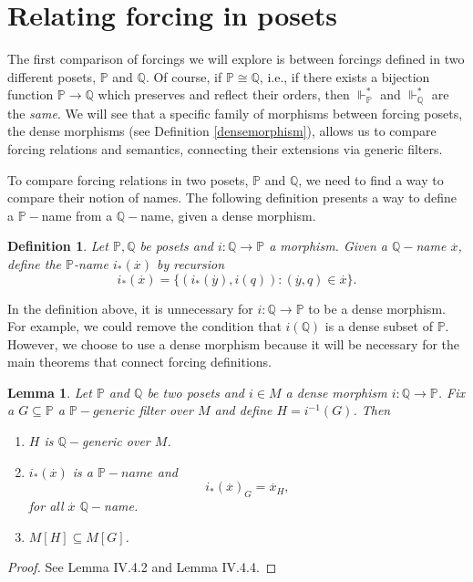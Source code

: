 \documentclass[10pt,longbibliography]{article}
\newtheorem{Def}[Theo]{Definition}
\newtheorem{Lemma}[Theo]{Lemma}
\newcommand{\Po}{\mathbb{P}}
\newcommand{\Qo}{\mathbb{Q}}
\newcommand{\ydot}{\overset{.}{y}}
\newcommand{\xdot}{\overset{.}{x}}
\newcommand{\forces}{\Vdash^{*}}
\begin{document}
\section{Relating forcing in posets}\label{rfr}


The first comparison of forcings we will explore is between forcings defined in two different posets, $\Po$ and $\Qo$. Of course, if $\Po \cong \Qo$, i.e., if there exists a bijection function $\Po \to \Qo$ which preserves and reflect their orders, then $\forces_{\Po}$ and $\forces_{\Qo}$ are the \emph{same}. We will see that a specific family of morphisms between forcing posets, the dense morphisms (see Definition \ref{densemorphism}), allows us to compare forcing relations and semantics, connecting their extensions via generic filters. 

To compare forcing relations in two posets, $\Po$ and $\Qo$, we need to find a way to compare their notion of names. The following definition presents a way to define a $\Po-$name from a $\Qo-$name, given a dense morphism.
\begin{Def}\label{i*definition}
	Let $\Po,\Qo$ be posets and $i: \Qo \to \Po$ a  morphism. Given a $\Qo-$name $\xdot$, define the $\Po$-name  $i_{*}(\xdot)$ by recursion $$i_{*}(\xdot) = \{(i_{*}(\ydot),  i(q)): (\ydot,q) \in \xdot \}.$$  
\end{Def}
In the definition above, it is unnecessary for $i: \Qo \to \Po$ to be a dense morphism. For example, we could remove the condition that $i(\Qo)$ is a dense subset of $\Po$. However, we choose to use a dense morphism because it will be necessary for the main theorems that connect forcing definitions.
\begin{Lemma}\label{completemorphismextensions}
	Let  $\Po$ and $\Qo$ be two posets and $i \in M$ a dense morphism $i: \Qo \to \Po$. Fix a $G \subseteq \Po$ a $\Po-generic$ filter over $M$ and define $H = i^{-1}(G)$. Then 
	\begin{enumerate}
		\item $H$ is $\Qo-$generic over $M$.
		\item $i_{*}(\xdot)$ is a $\Po-name$ and $$i_{*}(\xdot)_{G} = \xdot_{H},$$ for all $\xdot$ $\Qo-$name.
		\item $M[H] \subseteq M[G]$.
	\end{enumerate}
\end{Lemma}
\begin{proof}
	See \cite{Kunen11} Lemma IV.4.2 and Lemma IV.4.4.
\end{proof}
\end{document}
